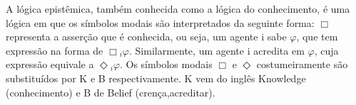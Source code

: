          \indent A lógica epistêmica, também conhecida como a lógica do conhecimento, é uma lógica em que os símbolos modais são interpretados da seguinte forma: $\Box$ representa a asserção que é conhecida, ou seja, um agente i sabe $\varphi$, que tem expressão na forma de $\Box$$_{i}$$\varphi$. Similarmente, um agente i acredita  em $\varphi$, cuja expressão equivale a $\Diamond$$_{i}$$\varphi$. Os símbolos modais  $\Box$ e $\Diamond$ costumeiramente são substituídos por K e B respectivamente. K vem do inglês Knowledge (conhecimento) e B de Belief (crença,acreditar).\\

